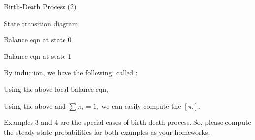 \begin{frame}{Birth-Death Process (2)}


{
\small
  \plitemsep 0.03in
  \bci
  
\item State transition diagram
\vspace{-0.4cm}

\item<2-> Balance eqn at state 0

\item<4-> Balance eqn at state 1  
\eci
}
{
\small
  \plitemsep 0.07in
  \bci
\item<7-> By induction, we have the following: called :

\item<9-> Using the above local balance eqn,

\item<10-> Using the above and $\sum \pi_i =1,$ we can easily compute the $[\pi_i].$


\item<11-> Examples 3 and 4 are the special cases of birth-death
  process. So, please compute the steady-state probabilities for both
  examples as your homeworks.  

  \eci
 
}
  


\end{frame}






